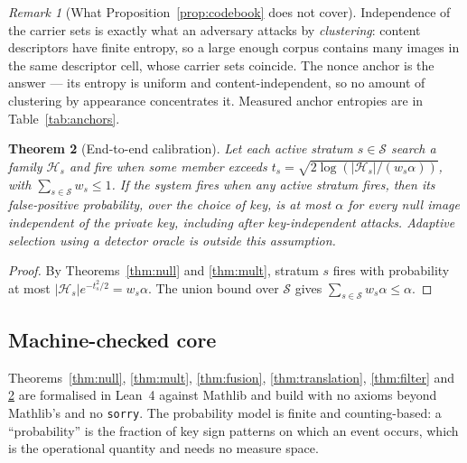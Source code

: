 \documentclass[10pt,twocolumn]{article}
\newtheorem{theorem}{Theorem}
\theoremstyle{definition}
\theoremstyle{remark}
\newtheorem{remark}[theorem]{Remark}
\newcommand{\lean}[1]{\texttt{#1}}
\begin{document}
\begin{remark}[What Proposition~\ref{prop:codebook} does not cover]
Independence of the carrier sets is exactly what an adversary attacks by
\emph{clustering}: content descriptors have finite entropy, so a large enough
corpus contains many images in the same descriptor cell, whose carrier sets
coincide. The nonce anchor is the answer --- its entropy is uniform and
content-independent, so no amount of clustering by appearance concentrates it.
Measured anchor entropies are in Table~\ref{tab:anchors}.
\end{remark}

\begin{theorem}[End-to-end calibration]
\label{thm:endtoend}
 Let each active stratum $s\in\mathcal{S}$ search a family $\mathcal{H}_s$ and
 fire when some member exceeds
 $t_s=\sqrt{2\log(|\mathcal{H}_s|/(w_s\alpha))}$, with
 $\sum_{s\in\mathcal{S}}w_s\leq1$. If the system fires when any active stratum
 fires, then its false-positive probability, over the choice of key, is at most
 $\alpha$ for every null image independent of the private key, including after
 key-independent attacks. Adaptive selection using a detector oracle is outside
 this assumption.
\end{theorem}
\begin{proof}
 By Theorems~\ref{thm:null} and \ref{thm:mult}, stratum $s$ fires with
 probability at most $|\mathcal{H}_s|e^{-t_s^{2}/2}=w_s\alpha$. The union bound
 over $\mathcal{S}$ gives
 $\sum_{s\in\mathcal{S}}w_s\alpha\leq\alpha$.
\end{proof}

\subsection{Machine-checked core}
\label{sec:lean}

Theorems~\ref{thm:null}, \ref{thm:mult}, \ref{thm:fusion}, \ref{thm:translation},
\ref{thm:filter} and \ref{thm:endtoend} are formalised in Lean~4 against Mathlib
and build with no axioms beyond Mathlib's and no \lean{sorry}. The probability
model is finite and counting-based: a ``probability'' is the fraction of key sign
patterns on which an event occurs, which is the operational quantity and needs no
measure space.
\end{document}

